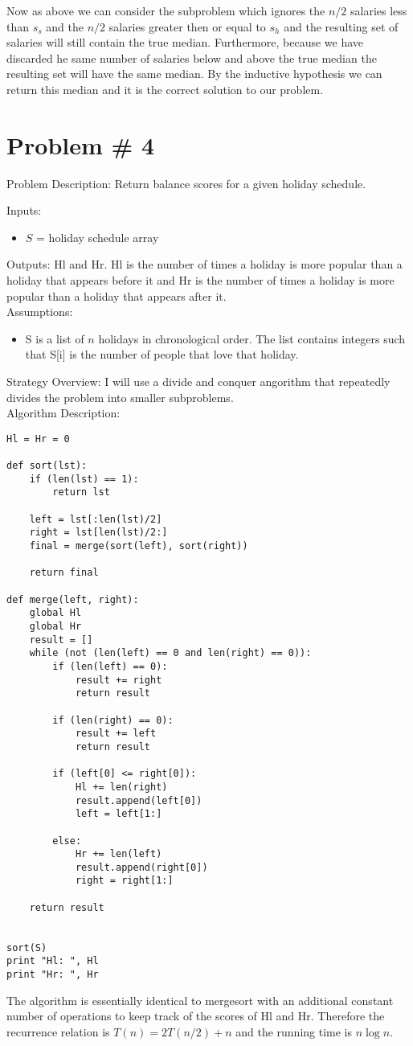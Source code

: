 \documentclass{article}
\begin{document}
Now as above we can consider the subproblem which ignores the $n/2$ salaries less than $s_s$ and the $n/2$ salaries greater then or equal to $s_h$ and the resulting set of salaries will still contain the true median. Furthermore, because we have discarded he same number of salaries below and above the true median the resulting set will have the same median. By the inductive hypothesis we can return this median and it is the correct solution to our problem.
\section*{Problem \# 4}
Problem Description: Return balance scores for a given holiday schedule.

Inputs:
\begin{itemize}
    \item $S$ = holiday schedule array
\end{itemize}

Outputs: Hl and Hr. Hl is the number of times a holiday is more popular than a holiday that appears before it and Hr is the number of times a holiday is more popular than a holiday that appears after it.\\

Assumptions:
\begin{itemize}
    \item S is a list of $n$ holidays in chronological order. The list contains integers such that S[i] is the number of people that love that holiday.
\end{itemize}

Strategy Overview:
I will use a divide and conquer angorithm that repeatedly divides the problem into smaller subproblems.\\

Algorithm Description:
\begin{lstlisting}
Hl = Hr = 0

def sort(lst):
    if (len(lst) == 1):
        return lst

    left = lst[:len(lst)/2]
    right = lst[len(lst)/2:]
    final = merge(sort(left), sort(right))
    
    return final

def merge(left, right):
    global Hl
    global Hr
    result = []
    while (not (len(left) == 0 and len(right) == 0)):
        if (len(left) == 0):
            result += right
            return result

        if (len(right) == 0):
            result += left
            return result

        if (left[0] <= right[0]):
            Hl += len(right)
            result.append(left[0])
            left = left[1:]

        else:
            Hr += len(left)
            result.append(right[0])
            right = right[1:]

    return result


sort(S)
print "Hl: ", Hl
print "Hr: ", Hr
\end{lstlisting}
The algorithm is essentially identical to mergesort with an additional constant number of operations to keep track of the scores of Hl and Hr. Therefore the recurrence relation is $T(n) = 2T(n/2) + n$ and the running time is $n\log n$.
\end{document}
